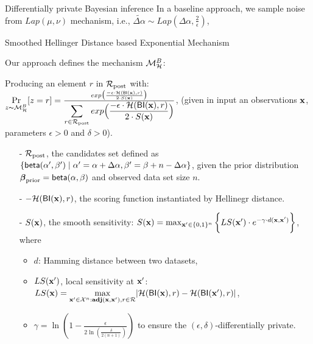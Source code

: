 \documentclass[final,hyperref={pdfpagelabels=false}]{beamer}
\begin{document}
\begin{frame}[t]
\begin{columns}[t]
\begin{column}{.485\textwidth}
\begin{block}{Differentially private Bayesian inference}
In a baseline approach, we sample noise from $Lap(\mu,\nu)$ mechanism, i.e., $\widetilde{\Delta \alpha}\sim Lap(\Delta \alpha, \frac{2}{\epsilon})$,

\end{block}



\begin{block}{Smoothed Hellinger Distance based Exponential Mechanism}

Our approach defines the mechanism $\mathcal{M}^{B}_{\mathcal{H}}$:

Producing an element $r$ in $\mathcal{R}_{\textup{post}}$ with:
$
\underset{z \thicksim \mathcal{M}^{B}_{\mathcal{H}}}{\Pr}[z=r] = 
\frac 
{exp\big(\frac{-\epsilon\cdot\mathcal{H}(\mathsf{BI}(\textbf{x}),r)}{2\cdot S(\textbf{x})}\big)}
{\displaystyle\sum_{r\in\mathcal{R}_{\textup{post}}} exp\Big(\frac{-\epsilon\cdot\mathcal{H}(\mathsf{BI}(\textbf{x}),r)}{2\cdot S(\textbf{x})}\Big)}
$,
(given in input an observations $\textbf{x}$, parameters $\epsilon>0$ and $\delta>0$).

\begin{itemize}
  \item[-] $\mathcal{R}_{\textup{post}}$, the candidates set defined as $\{\mathsf{beta}(\alpha',\beta')\mid \alpha'=\alpha+\Delta\alpha, \beta'=\beta+n-\Delta\alpha\}$, given the prior distribution $\boldsymbol{\beta}_{\textup{prior}}=\mathsf{beta}(\alpha, \beta)$ and observed data set size $n$.

  \item[-] $-\mathcal{H}(\mathsf{BI}(\textbf{x}),r)$, the scoring function instantiated by Hellinegr distance.

  \item[-] $S(\textbf{x})$, the smooth sensitivity:
  $
  S(\textbf{x})=\max_{\textbf{x}' \in \{0,1\}^{n}}\bigg \{LS(\textbf{x}') \cdot e^{-\gamma\cdot d(\textbf{x},\textbf{x}')}\bigg\}
  $,
  where
  \begin{itemize}
   \item $d$: Hamming distance between two datasets, 

   \item $LS(\textbf{x}')$, local sensitivity at $\textbf{x}'$:
   $
   LS(\textbf{x})=\max\limits_{\textbf{x}' \in \mathcal{X}^n:\textbf{adj}(\textbf{x},\textbf{x}'), r\in \mathcal{R}}\lvert \mathcal{H}(\mathsf{BI}(\textbf{x}), r) - \mathcal{H}(\mathsf{BI}(\textbf{x}'), r)\rvert
   $,

   \item $\gamma =
   \ln(1 - \frac{\epsilon}{2 \ln (\frac{\delta}{2 (n + 1)})})$ to ensure the $(\epsilon,\delta)$-differentially private.
 \end{itemize}
\end{itemize}



\end{block}
\end{column}
\end{columns}
\end{frame}
\end{document}

